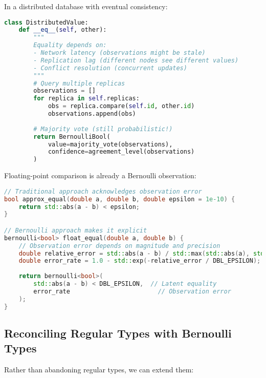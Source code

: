\begin{example}
In a distributed database with eventual consistency:
\begin{lstlisting}[language=Python]
class DistributedValue:
    def __eq__(self, other):
        """
        Equality depends on:
        - Network latency (observations might be stale)
        - Replication lag (different nodes see different values)
        - Conflict resolution (concurrent updates)
        """
        # Query multiple replicas
        observations = []
        for replica in self.replicas:
            obs = replica.compare(self.id, other.id)
            observations.append(obs)
        
        # Majority vote (still probabilistic!)
        return BernoulliBool(
            value=majority_vote(observations),
            confidence=agreement_level(observations)
        )
\end{lstlisting}
\end{example}

\begin{example}
Floating-point comparison is already a Bernoulli observation:
\begin{lstlisting}[language=C++]
// Traditional approach acknowledges observation error
bool approx_equal(double a, double b, double epsilon = 1e-10) {
    return std::abs(a - b) < epsilon;
}

// Bernoulli approach makes it explicit
bernoulli<bool> float_equal(double a, double b) {
    // Observation error depends on magnitude and precision
    double relative_error = std::abs(a - b) / std::max(std::abs(a), std::abs(b));
    double error_rate = 1.0 - std::exp(-relative_error / DBL_EPSILON);
    
    return bernoulli<bool>(
        std::abs(a - b) < DBL_EPSILON,  // Latent equality
        error_rate                        // Observation error
    );
}
\end{lstlisting}
\end{example}

\subsection{Reconciling Regular Types with Bernoulli Types}

Rather than abandoning regular types, we can extend them:

